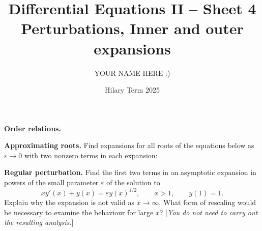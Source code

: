 \documentclass[answers]{exam}
\title{Differential Equations II -- Sheet 4\\Perturbations, Inner and outer expansions}
\author{YOUR NAME HERE :)}
\date{Hilary Term 2025}
\begin{document}
\maketitle
\begin{questions}

\question%
\textbf{Order relations.}



\question%
\textbf{Approximating roots.}
Find expansions for all roots of the equations below as $\varepsilon \to 0$ with two nonzero terms in each expansion:



\question%
\textbf{Regular perturbation.}
Find the first two terms in an asymptotic expansion in powers of the small parameter $\varepsilon$ of the solution to \[
	x y'(x)+y(x)=\varepsilon y(x)^{1 / 2}, \qquad x>1, \qquad y(1)=1 .
\] Explain why the expansion is not valid as $x \to \infty$. What form of rescaling would be necessary to examine the behaviour for large $x$? [\emph{You do not need to carry out the resulting analysis.}]




\end{questions}
\end{document}
